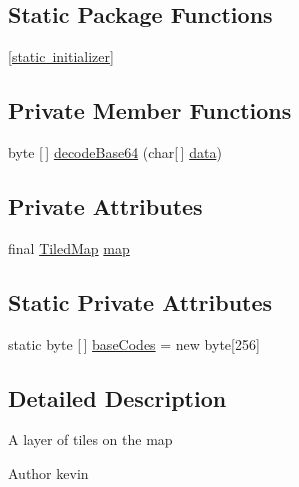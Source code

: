 \subsection*{Static Package Functions}
\begin{DoxyCompactItemize}
\item 
\mbox{\hyperlink{classorg_1_1newdawn_1_1slick_1_1tiled_1_1_layer_a9b36eb42cf8972b2fce1cef60c4e3283}{\mbox{[}static initializer\mbox{]}}}
\end{DoxyCompactItemize}
\subsection*{Private Member Functions}
\begin{DoxyCompactItemize}
\item 
byte \mbox{[}$\,$\mbox{]} \mbox{\hyperlink{classorg_1_1newdawn_1_1slick_1_1tiled_1_1_layer_af31e22c2a21a77e000afee8a40393019}{decode\+Base64}} (char\mbox{[}$\,$\mbox{]} \mbox{\hyperlink{classorg_1_1newdawn_1_1slick_1_1tiled_1_1_layer_a9370f031c215f22f2b18135d8ca5cbc8}{data}})
\end{DoxyCompactItemize}
\subsection*{Private Attributes}
\begin{DoxyCompactItemize}
\item 
final \mbox{\hyperlink{classorg_1_1newdawn_1_1slick_1_1tiled_1_1_tiled_map}{Tiled\+Map}} \mbox{\hyperlink{classorg_1_1newdawn_1_1slick_1_1tiled_1_1_layer_ad6494d6da75ffb77cacdec8d38d74982}{map}}
\end{DoxyCompactItemize}
\subsection*{Static Private Attributes}
\begin{DoxyCompactItemize}
\item 
static byte \mbox{[}$\,$\mbox{]} \mbox{\hyperlink{classorg_1_1newdawn_1_1slick_1_1tiled_1_1_layer_a2e6c0049e12c85170c87ea9ef3b54779}{base\+Codes}} = new byte\mbox{[}256\mbox{]}
\end{DoxyCompactItemize}


\subsection{Detailed Description}
A layer of tiles on the map

\begin{DoxyAuthor}{Author}
kevin 
\end{DoxyAuthor}


